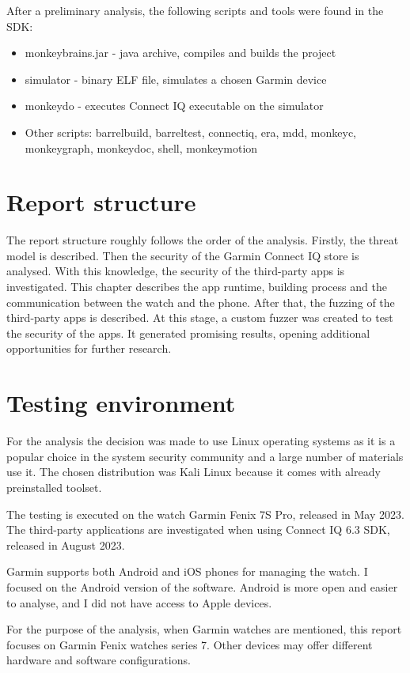 After a preliminary analysis, the following scripts and tools were found in the SDK:

\begin{itemize}
    \item monkeybrains.jar - java archive, compiles and builds the project
    \item simulator - binary ELF file, simulates a chosen Garmin device
    \item monkeydo - executes Connect IQ executable on the simulator
    \item Other scripts: barrelbuild, barreltest, connectiq, era, mdd, monkeyc, monkeygraph, monkeydoc, shell, monkeymotion
\end{itemize}

\section{Report structure}
The report structure roughly follows the order of the analysis.
Firstly, the threat model is described.
Then the security of the Garmin Connect IQ store is analysed.
With this knowledge, the security of the third-party apps is investigated.
This chapter describes the app runtime, building process and the communication between the watch and the phone.
After that, the fuzzing of the third-party apps is described.
At this stage, a custom fuzzer was created to test the security of the apps.
It generated promising results, opening additional opportunities for further research.

\section{Testing environment}
For the analysis the decision was made to use Linux operating systems as it is a popular choice in the system security community and a large number of materials use it.
The chosen distribution was Kali Linux because it comes with already preinstalled toolset.

The testing is executed on the watch Garmin Fenix 7S Pro, released in May 2023.
The third-party applications are investigated when using Connect IQ 6.3 SDK, released in August 2023.

Garmin supports both Android and iOS phones for managing the watch.
I focused on the Android version of the software.
Android is more open and easier to analyse, and I did not have access to Apple devices.


For the purpose of the analysis, when Garmin watches are mentioned, this report focuses on Garmin Fenix watches series 7.
Other devices may offer different hardware and software configurations.



